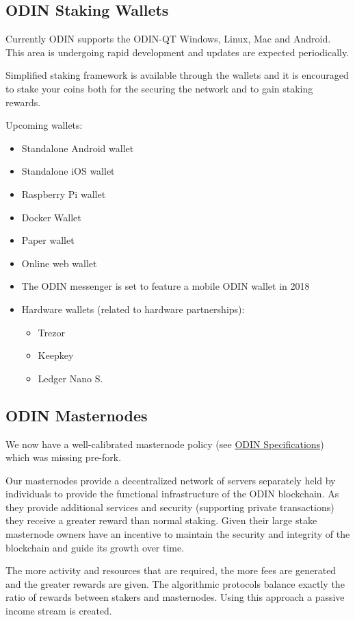 \subsection{ODIN Staking Wallets}
Currently ODIN supports the ODIN-QT Windows, Linux, Mac and Android. This area is undergoing rapid development and updates are expected periodically.

Simplified staking framework is available through the wallets and it is encouraged to stake your coins both for the securing the network and to gain staking rewards.

Upcoming wallets:
\begin{itemize}
   \item Standalone Android wallet
   \item Standalone iOS wallet
   \item Raspberry Pi wallet
   \item Docker Wallet
   \item Paper wallet
   \item Online web wallet
   \item The ODIN messenger is set to feature a mobile ODIN wallet in 2018
   \item Hardware wallets (related to hardware partnerships):
   \begin{itemize}
      \item Trezor
      \item Keepkey
      \item Ledger Nano S.
   \end{itemize}
\end{itemize}

\subsection{​ODIN Masternodes}
We now have a well-calibrated masternode policy (see \hyperlink{specifications}{ODIN Specifications}) which was missing pre-fork.  

Our masternodes provide a decentralized network of servers separately held by individuals to provide the functional infrastructure of the ODIN blockchain.  As they provide additional services and security (supporting private transactions) they receive a greater reward than normal staking.   Given their large stake masternode owners have an incentive to maintain the security and integrity of the blockchain and guide its growth over time.

The more activity and resources that are required, the more fees are generated and the greater rewards are given. The algorithmic protocols balance exactly the ratio of rewards between stakers and masternodes. Using this approach a passive income stream is created.

